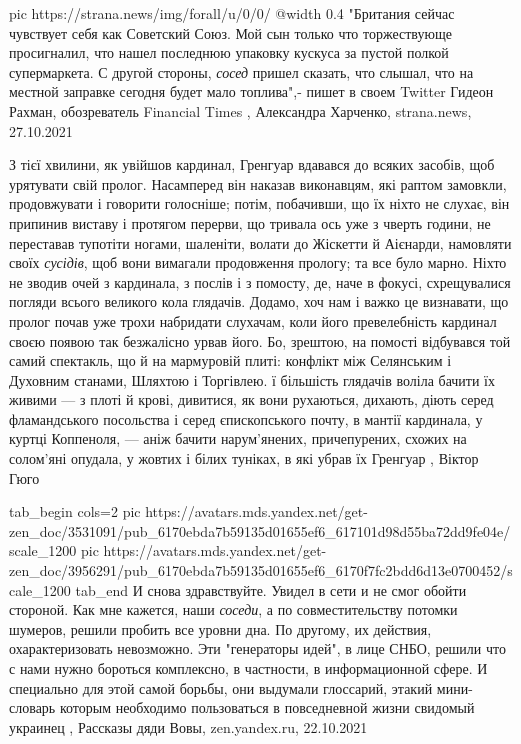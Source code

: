\ifcmt
  pic https://strana.news/img/forall/u/0/0/%
  @width 0.4
\fi
"Британия сейчас чувствует себя как Советский Союз. Мой сын только что
торжествующе просигналил, что нашел последнюю упаковку кускуса за пустой полкой
супермаркета. С другой стороны, \emph{сосед} пришел сказать, что слышал, что на
местной заправке сегодня будет мало топлива",- пишет в своем Twitter Гидеон
Рахман, обозреватель Financial Times
, 
Александра Харченко, strana.news, 27.10.2021

З тієї хвилини, як увійшов кардинал, Гренгуар вдавався до всяких засобів, щоб
урятувати свій пролог. Насамперед він наказав виконавцям, які раптом замовкли,
продовжувати і говорити голосніше; потім, побачивши, що їх ніхто не слухає, він
припинив виставу і протягом перерви, що тривала ось уже з чверть години, не
переставав тупотіти ногами, шаленіти, волати до Жіскетти й Аієнарди, намовляти
своїх \emph{сусідів}, щоб вони вимагали продовження прологу; та все було марно. Ніхто
не зводив очей з кардинала, з послів і з помосту, де, наче в фокусі,
схрещувалися погляди всього великого кола глядачів. Додамо, хоч нам і важко це
визнавати, що пролог почав уже трохи набридати слухачам, коли його
превелебність кардинал своєю появою так безжалісно урвав його. Бо, зрештою, на
помості відбувався той самий спектакль, що й на мармуровій плиті: конфлікт між
Селянським і Духовним станами, Шляхтою і Торгівлею. ї більшість глядачів воліла
бачити їх живими — з плоті й крові, дивитися, як вони рухаються, дихають, діють
серед фламандського посольства і серед єпископського почту, в мантії кардинала,
у куртці Коппеноля, — аніж бачити нарум'янених, причепурених, схожих на
солом'яні опудала, у жовтих і білих туніках, в які убрав їх Гренгуар
, Віктор Гюго

\ifcmt
  tab_begin cols=2
     pic https://avatars.mds.yandex.net/get-zen_doc/3531091/pub_6170ebda7b59135d01655ef6_617101d98d55ba72dd9fe04e/scale_1200
     pic https://avatars.mds.yandex.net/get-zen_doc/3956291/pub_6170ebda7b59135d01655ef6_6170f7fc2bdd6d13e0700452/scale_1200
  tab_end
\fi
И снова здравствуйте. Увидел в сети и не смог обойти стороной. Как мне кажется,
наши \emph{соседи}, а по совместительству потомки шумеров, решили пробить все уровни
дна. По другому, их действия, охарактеризовать невозможно.
Эти "генераторы идей", в лице СНБО, решили что с нами нужно бороться
комплексно, в частности, в информационной сфере. И специально для этой самой
борьбы, они выдумали глоссарий, этакий мини-словарь которым необходимо
пользоваться в повседневной жизни свидомый украинец
, 
Рассказы дяди Вовы, zen.yandex.ru, 22.10.2021

